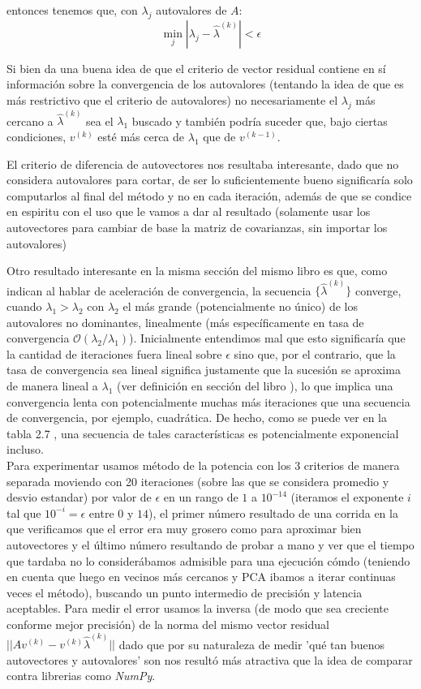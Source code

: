 entonces tenemos que, con $\lambda_j$ autovalores de $A$:
\begin{equation}
 \min_{j}|\lambda_j - \hat{\lambda}^{(k)}| < \epsilon
\end{equation}

Si bien da una buena idea de que el criterio de vector residual contiene en sí información sobre la convergencia de los autovalores (tentando la idea de que es más restrictivo que el criterio de autovalores) no necesariamente el $\lambda_j$ más cercano a $\hat{\lambda}^{(k)}$ sea el $\lambda_1$ buscado y también podría suceder que, bajo ciertas condiciones, $v^{(k)}$ esté más cerca de $\lambda_1$ que de $v^{(k-1)}$.

El criterio de diferencia de autovectores nos resultaba interesante, dado que no considera autovalores para cortar, de ser lo suficientemente bueno significaría solo computarlos al final del método y no en cada iteración, además de que se condice en espiritu con el uso que le vamos a dar al resultado (solamente usar los autovectores para cambiar de base la matriz de covarianzas, sin importar los autovalores)

Otro resultado interesante en la misma sección del mismo libro es que, como indican al hablar de aceleración de convergencia, la secuencia $\{\hat{\lambda}^{(k)}\}$ converge, cuando $\lambda_1 > \lambda_2 $ con $\lambda_2$ el más grande (potencialmente no único) de los autovalores no dominantes, linealmente (más específicamente en tasa de convergencia $\mathcal{O}(\lambda_2/\lambda_1)$).
Inicialmente entendimos mal que esto significaría que la cantidad de iteraciones fuera lineal sobre $\epsilon$ sino que, por el contrario, que la tasa de convergencia sea lineal significa justamente que la sucesión se aproxima de manera lineal a $\lambda_1$ (ver definición en sección del libro \cite{Burden}), lo que implica una convergencia lenta con potencialmente muchas más iteraciones que una secuencia de convergencia, por ejemplo, cuadrática. De hecho, como se puede ver en la tabla 2.7 \cite{Burden}, una secuencia de tales características es potencialmente exponencial incluso.\\

Para experimentar usamos método de la potencia con los 3 criterios de manera separada moviendo con 20 iteraciones (sobre las que se considera promedio y desvio estandar) por valor de $\epsilon$ en un rango de $1$ a $10^{-14}$ (iteramos el exponente $i$ tal que $10^{-i}=\epsilon$ entre $0$ y $14$), el primer número resultado de una corrida en la que verificamos que el error era muy grosero como para aproximar bien autovectores y el último número resultando de probar a mano y ver que el tiempo que tardaba no lo considerábamos admisible para una ejecución cómdo (teniendo en cuenta que luego en vecinos más cercanos y PCA ibamos a iterar continuas veces el método), buscando un punto intermedio de precisión y latencia aceptables. Para medir el error usamos la inversa (de modo que sea creciente conforme mejor precisión) de la norma del mismo vector residual $|| A v^{(k)} - v^{(k)}\hat{\lambda}^{(k)} ||$ dado que por su naturaleza de medir 'qué tan buenos autovectores y autovalores' son nos resultó más atractiva que la idea de comparar contra librerias como \textit{NumPy}.

